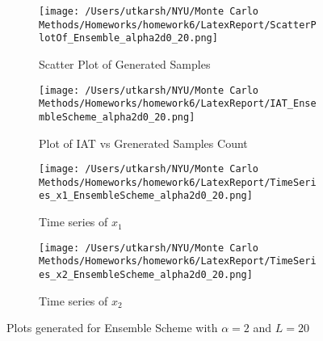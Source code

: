 \documentclass[11pt]{article}
\begin{document}
\begin{figure}[H]
	\centering
	\begin{subfigure}{.22\textwidth}
		\texttt{[image: /Users/utkarsh/NYU/Monte Carlo Methods/Homeworks/homework6/LatexReport/ScatterPlotOf\_Ensemble\_alpha2d0\_20.png]}
		\caption{Scatter Plot of Generated Samples}
		\label{fig:en_2_scatter_20}
	\end{subfigure}
	\begin{subfigure}{.22\textwidth}
		\texttt{[image: /Users/utkarsh/NYU/Monte Carlo Methods/Homeworks/homework6/LatexReport/IAT\_EnsembleScheme\_alpha2d0\_20.png]}
		\caption{Plot of IAT vs Grenerated Samples Count}
		\label{fig:en_2_iat_20}
	\end{subfigure}
	\begin{subfigure}{.22\textwidth}
		\texttt{[image: /Users/utkarsh/NYU/Monte Carlo Methods/Homeworks/homework6/LatexReport/TimeSeries\_x1\_EnsembleScheme\_alpha2d0\_20.png]}
		\caption{Time series of $x_1$}
		\label{fig:en_2_time_x1_20}
	\end{subfigure}
	\begin{subfigure}{.22\textwidth}
		\texttt{[image: /Users/utkarsh/NYU/Monte Carlo Methods/Homeworks/homework6/LatexReport/TimeSeries\_x2\_EnsembleScheme\_alpha2d0\_20.png]}
		\caption{Time series of $x_2$}
		\label{fig:en_2_time_x2_20}
	\end{subfigure}
	\caption{Plots generated for Ensemble Scheme with $\alpha = 2$ and $L = 20$}
	\label{fig:en_2_plots_20}
\end{figure}
\end{document}
